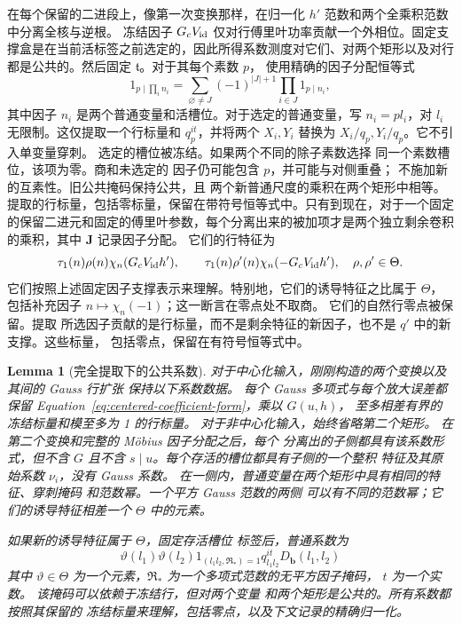 \documentclass[11pt,a4paper]{article}
\numberwithin{equation}{section}
\numberwithin{figure}{section}
\newtheorem{lemma}[theorem]{Lemma}
\theoremstyle{definition}
\theoremstyle{remark}
\begin{document}
在每个保留的二进段上，像第一次变换那样，在归一化 \(h'\) 范数和两个全乘积范数中分离全核与逆根。
冻结因子 \(G_cV_{\rm id}\) 仅对行傅里叶功率贡献一个外相位。固定支撑盒是在当前活标签之前选定的，因此所得系数测度对它们、对两个矩形以及对行都是公共的。然后固定 \(\mathfrak t\)。对于其每个素数 \(p\)，
使用精确的因子分配恒等式
\[
 1_{p\mid\prod_i n_i}
 =\sum_{\varnothing\ne J}(-1)^{|J|+1}
       \prod_{i\in J}1_{p\mid n_i},
\]
其中因子 \(n_i\) 是两个普通变量和活槽位。对于选定的普通变量，写 \(n_i=pl_i\)，对 \(l_i\) 无限制。这仅提取一个行标量和
\(q_p^{it}\)，并将两个 \(X_i,Y_i\) 替换为
\(X_i/q_p,Y_i/q_p\)。它不引入单变量穿刺。
选定的槽位被冻结。如果两个不同的除子素数选择
同一个素数槽位，该项为零。商和未选定的
因子仍可能包含 \(p\)，并可能与对侧重叠；
不施加新的互素性。旧公共掩码保持公共，且
两个新普通尺度的乘积在两个矩形中相等。
提取的行标量，包括零标量，保留在带符号恒等式中。只有到现在，对于一个固定的保留二进元和固定的傅里叶参数，每个分离出来的被加项才是两个独立剩余卷积的乘积，其中 \(\mathbf J\) 记录因子分配。
它们的行特征为
\[
 \tau_1(n)\rho(n)\chi_n(G_cV_{\rm id}h'),\qquad
 \tau_1(n)\rho'(n)\chi_n(-G_cV_{\rm id}h'),
 \quad \rho,\rho'\in\Theta.
\]
它们按照上述固定因子支撑表示来理解。特别地，它们的诱导特征之比属于
\(\Theta\)，包括补充因子
\(n\mapsto\chi_n(-1)\)；这一断言在零点处不取商。
它们的自然行零点被保留。提取
所选因子贡献的是行标量，而不是剩余特征的新因子，也不是 \(q'\) 中的新支撑。这些标量，
包括零点，保留在有符号恒等式中。

\begin{lemma}[完全提取下的公共系数]
\label{lem:centered-coefficient-invariant}
对于中心化输入，刚刚构造的两个变换以及其间的 Gauss 行扩张
保持以下系数数据。
每个 Gauss 多项式与每个放大误差都保留
Equation~\eqref{eq:centered-coefficient-form}，乘以 \(G(u,h)\)，
至多相差有界的冻结标量和模至多为 1 的行标量。
对于非中心化输入，始终省略第二个矩形。
在第二个变换和完整的 M\"obius 因子分配之后，每个
分离出的子侧都具有该系数形式，但不含 \(G\) 且不含
\(s\mid u\)。每个存活的槽位都具有子侧的一个整积
特征及其原始系数 \(\nu_i\)，没有 Gauss 系数。
在一侧内，普通变量在两个矩形中具有相同的特征、穿刺掩码
和范数幂。一个平方 Gauss 范数的两侧
可以有不同的范数幂；它们的诱导特征相差一个
\(\Theta\) 中的元素。

如果新的诱导特征属于 \(\Theta\)，固定存活槽位
标签后，普通系数为
\[
 \vartheta(l_1)\vartheta(l_2)
 1_{(l_1l_2,\mathfrak R_*)=1}q_{l_1l_2}^{it}D_{\mathbf b}(l_1,l_2)
\]
其中 \(\vartheta\in\Theta\) 为一个元素，\(\mathfrak R_*\) 为一个多项式范数的无平方因子掩码，
\(t\) 为一个实数。
该掩码可以依赖于冻结行，但对两个变量
和两个矩形是公共的。所有系数都按照其保留的
冻结标量来理解，包括零点，以及下文记录的精确归一化。
\end{lemma}
\end{document}
